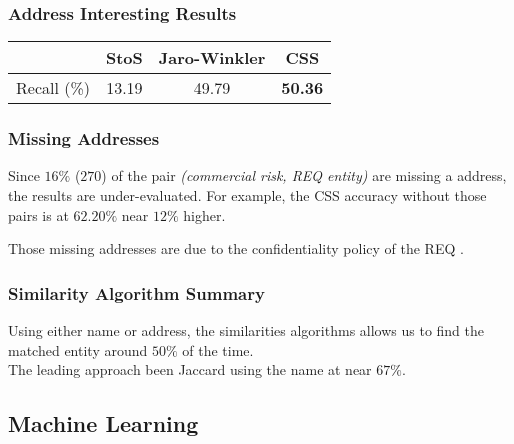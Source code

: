 \documentclass[aspectratio=169,10pt,xcolor=x11names,english,french]{beamer}
\begin{document}
	\begin{frame}\frametitle{Address Interesting Results}
		\begin{table}[]
		\begin{tabular}{cccc}
				\toprule
				& StoS   & Jaro-Winkler & CSS \\
				\midrule
				Recall (\%) & 13.19 &  49.79 & \textbf{50.36}    
				\\\bottomrule
			\end{tabular}
		\end{table}
	\end{frame}
	
	\begin{frame}\frametitle{Missing Addresses}
		Since $16\%$ ($270$) of the pair \textit{(commercial risk, REQ entity)} are missing a address, the results are under-evaluated. For example, the CSS accuracy without those pairs is at $62.20\%$ near $12\%$ higher. \\\bigskip
		
		Those missing addresses are due to the confidentiality policy of the REQ \cite{guidereq}.
	\end{frame}
	
	\begin{frame}\frametitle{Similarity Algorithm Summary}
		Using either name or address, the similarities algorithms allows us to find the matched entity around $50\%$ of the time. \\ The leading approach been Jaccard using the name at near $67\%$.
	\end{frame}
	
	\subsection{Machine Learning}
\end{document}
